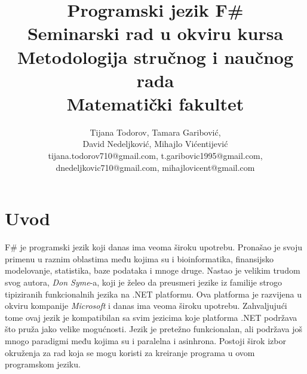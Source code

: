 \documentclass[a4paper]{article}
\begin{document}
\title{Programski jezik F\#\\ \small{Seminarski rad u okviru kursa\\Metodologija stručnog i naučnog rada\\ Matematički fakultet}}

\author{Tijana Todorov, Tamara Garibović,\\ David Nedeljković, Mihajlo Vićentijević \\ tijana.todorov710@gmail.com, t.garibovic1995@gmail.com, \\ dnedeljkovic710@gmail.com, mihajlovicent@gmail.com}


\maketitle


\tableofcontents
{}
{\setcounter{tocdepth}{1}}

\newpage

\section{Uvod}
\label{sec:uvod}

F\# je programski jezik koji danas ima veoma široku upotrebu. Pronašao je svoju primenu u raznim oblastima među kojima su i bioinformatika, finansijsko modelovanje, statistika, baze podataka i mnoge druge. Nastao je velikim trudom svog autora, {\em Don Syme}-a, koji je želeo da preusmeri jezike iz familije strogo tipiziranih funkcionalnih jezika na .NET platformu. Ova platforma je razvijena u okviru kompanije {\em Microsoft} i danas ima veoma široku upotrebu. Zahvaljujući tome ovaj jezik je kompatibilan sa svim jezicima koje platforma .NET podržava što pruža jako velike mogućnosti. Jezik je pretežno funkcionalan, ali podržava još mnogo paradigmi među kojima su i paralelna i asinhrona. Postoji širok izbor okruženja za rad koja se mogu koristi za kreiranje programa u ovom programskom jeziku. 
\end{document}
